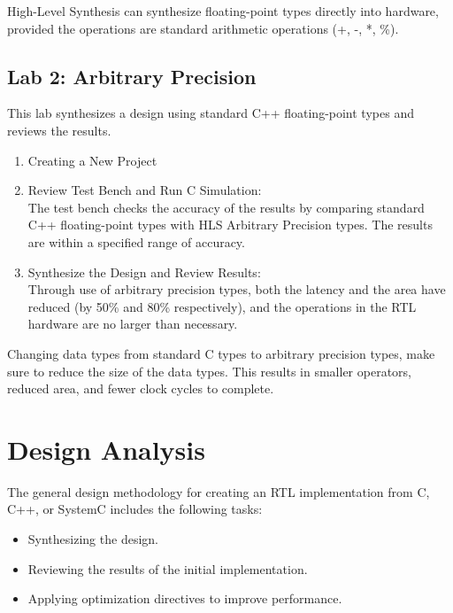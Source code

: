 \begin{highlight}
    High-Level Synthesis can synthesize floating-point types directly into hardware, provided the operations are standard arithmetic operations (+, -, *, \%).
\end{highlight}


\subsection{Lab 2: Arbitrary Precision}
This lab synthesizes a design using standard C++ floating-point types and reviews the results.

\begin{enumerate}[label=Step \arabic*:]
    \item Creating a New Project 
    \item Review Test Bench and Run C Simulation:\\ The test bench checks the accuracy of the results by comparing standard C++ floating-point types  with HLS Arbitrary Precision types. The results are within a specified range of accuracy.
    \item Synthesize the Design and Review Results:\\ Through use of arbitrary precision types, both the latency and
    the area have reduced (by 50\% and 80\% respectively), and the operations in the RTL hardware are no larger than necessary.
\end{enumerate}

\begin{highlight}
    Changing data types from standard C types to arbitrary precision types, make sure to reduce the size of the data types. This results in smaller operators, reduced area, and fewer clock cycles to complete.
\end{highlight}




\section{Design Analysis}
The general design methodology for creating an RTL implementation from C, C++, or SystemC includes the following tasks:
\begin{itemize}
    \item Synthesizing the design.
    \item Reviewing the results of the initial implementation.
    \item Applying optimization directives to improve performance.
\end{itemize}

